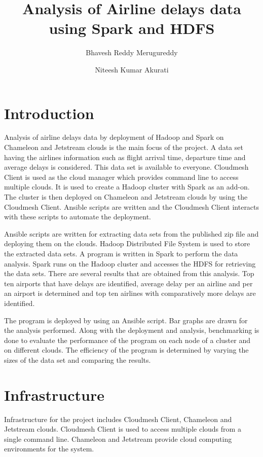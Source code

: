 \documentclass[9pt,twocolumn,twoside]{../../styles/osajnl}
\title{Analysis of Airline delays data using Spark and HDFS}
\author[1,*]{Bhavesh Reddy Merugureddy}
\author[1,**]{Niteesh Kumar Akurati}
\affil[1]{School of Informatics and Computing, Bloomington, IN 47408, U.S.A.}
\affil[*]{Corresponding authors:bmerugur@iu.edu}
\affil[**]{Corresponding authors: akuratin@iu.edu}
\begin{document}
\maketitle



\section{Introduction}

Analysis of airline delays data by deployment of Hadoop and Spark on
Chameleon and Jetstream clouds is the main focus of the project. A
data set having the airlines information such as flight arrival time,
departure time and average delays is considered. This data set is
available to everyone. Cloudmesh Client is used as the cloud manager
which provides command line to access multiple clouds. It is used to
create a Hadoop cluster with Spark as an add-on. The cluster is then
deployed on Chameleon and Jetstream clouds by using the Cloudmesh
Client. Ansible scripts are written and the Cloudmesh Client interacts
with these scripts to automate the deployment.

Ansible scripts are written for extracting data sets from the
published zip file and deploying them on the clouds. Hadoop
Distributed File System is used to store the extracted data sets. A
program is written in Spark to perform the data analysis. Spark runs
on the Hadoop cluster and accesses the HDFS for retrieving the data
sets. There are several results that are obtained from this
analysis. Top ten airports that have delays are identified, average
delay per an airline and per an airport is determined and top ten
airlines with comparatively more delays are identified.

The program is deployed by using an Ansible script. Bar graphs are
drawn for the analysis performed. Along with the deployment and
analysis, benchmarking is done to evaluate the performance of the
program on each node of a cluster and on different clouds. The
efficiency of the program is determined by varying the sizes of the
data set and comparing the results.

\section{Infrastructure} 

Infrastructure for the project includes Cloudmesh Client, Chameleon
and Jetstream clouds. Cloudmesh Client is used to access multiple
clouds from a single command line. Chameleon and Jetstream provide
cloud computing environments for the system.
\end{document}
